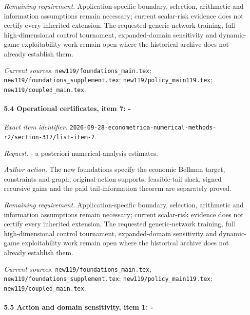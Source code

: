 \par\emph{Remaining requirement.} Application-specific boundary, selection, arithmetic and information assumptions remain necessary; current scalar-risk evidence does not certify every inherited extension. The requested generic-network training, full high-dimensional control tournament, expanded-domain sensitivity and dynamic-game exploitability work remain open where the historical archive does not already establish them.

\par\emph{Current sources.} \nolinkurl{new119/foundations_main.tex}; \nolinkurl{new119/foundations_supplement.tex}; \nolinkurl{new119/policy_main119.tex}; \nolinkurl{new119/coupled_main.tex}.

\paragraph{5.4 Operational certificates, item 7: -}

\emph{Exact item identifier.} \nolinkurl{2026-09-28-econometrica-numerical-methods-r2/section-317/list-item-7}.

\par\emph{Request.} - a posteriori numerical-analysis estimates.

\par\emph{Author action.} The new foundations specify the economic Bellman target, constraints and graph; original-action supports, feasible-tail slack, signed recursive gains and the paid tail-information theorem are separately proved.

\par\emph{Remaining requirement.} Application-specific boundary, selection, arithmetic and information assumptions remain necessary; current scalar-risk evidence does not certify every inherited extension. The requested generic-network training, full high-dimensional control tournament, expanded-domain sensitivity and dynamic-game exploitability work remain open where the historical archive does not already establish them.

\par\emph{Current sources.} \nolinkurl{new119/foundations_main.tex}; \nolinkurl{new119/foundations_supplement.tex}; \nolinkurl{new119/policy_main119.tex}; \nolinkurl{new119/coupled_main.tex}.

\paragraph{5.5 Action and domain sensitivity, item 1: -}

